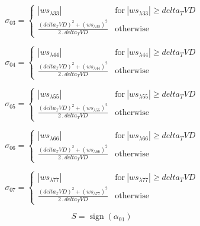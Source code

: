 \documentclass{article}
\begin{document}
\begin{dmath}\sigma_{0 3} = \begin{cases} \left|{ws_{\lambda 33}}\right| & \text{for}\: \left|{ws_{\lambda 33}}\right| \geq delta_TVD \\\frac{\left(delta_TVD \right)^{2} + \left(ws_{\lambda 33} \right)^{2}}{2 \,.\, delta_TVD} & \text{otherwise} 
\end{cases}\end{dmath}

\begin{dmath}\sigma_{0 4} = \begin{cases} \left|{ws_{\lambda 44}}\right| & \text{for}\: \left|{ws_{\lambda 44}}\right| \geq delta_TVD \\\frac{\left(delta_TVD \right)^{2} + \left(ws_{\lambda 44} \right)^{2}}{2 \,.\, delta_TVD} & \text{otherwise} 
\end{cases}\end{dmath}

\begin{dmath}\sigma_{0 5} = \begin{cases} \left|{ws_{\lambda 55}}\right| & \text{for}\: \left|{ws_{\lambda 55}}\right| \geq delta_TVD \\\frac{\left(delta_TVD \right)^{2} + \left(ws_{\lambda 55} \right)^{2}}{2 \,.\, delta_TVD} & \text{otherwise} 
\end{cases}\end{dmath}

\begin{dmath}\sigma_{0 6} = \begin{cases} \left|{ws_{\lambda 66}}\right| & \text{for}\: \left|{ws_{\lambda 66}}\right| \geq delta_TVD \\\frac{\left(delta_TVD \right)^{2} + \left(ws_{\lambda 66} \right)^{2}}{2 \,.\, delta_TVD} & \text{otherwise} 
\end{cases}\end{dmath}

\begin{dmath}\sigma_{0 7} = \begin{cases} \left|{ws_{\lambda 77}}\right| & \text{for}\: \left|{ws_{\lambda 77}}\right| \geq delta_TVD \\\frac{\left(delta_TVD \right)^{2} + \left(ws_{\lambda 77} \right)^{2}}{2 \,.\, delta_TVD} & \text{otherwise} 
\end{cases}\end{dmath}

\begin{dmath}S = \operatorname{sign}{\left (\alpha_{01} \right )}\end{dmath}
\end{document}
